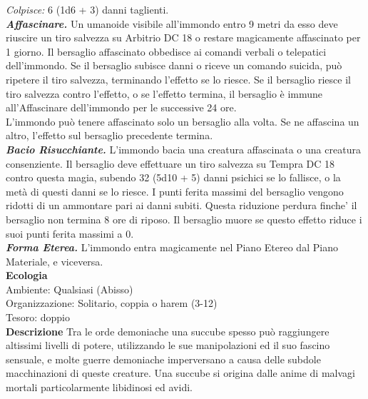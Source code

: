 \begin{multicols}{2}
\emph{Colpisce:} 6 (1d6 + 3) danni taglienti.\\
\emph{\textbf{Affascinare.}} Un umanoide visibile all'immondo entro 9 metri da esso deve riuscire un tiro salvezza su Arbitrio DC  18 o restare magicamente affascinato per 1 giorno. Il bersaglio affascinato obbedisce ai comandi verbali o telepatici dell'immondo. Se il bersaglio subisce danni o riceve un comando suicida, può ripetere il tiro salvezza, terminando l'effetto se lo riesce. Se il bersaglio riesce il tiro salvezza contro l'effetto, o se l'effetto termina, il bersaglio è immune all'Affascinare dell'immondo per le successive 24 ore.\\
L'immondo può tenere affascinato solo un bersaglio alla volta. Se ne affascina un altro, l'effetto sul bersaglio precedente termina.\\
\emph{\textbf{Bacio Risucchiante.}} L'immondo bacia una creatura affascinata o una creatura consenziente. Il bersaglio deve effettuare un tiro salvezza su Tempra DC  18 contro questa magia, subendo 32 (5d10 + 5) danni psichici se lo fallisce, o la metà di questi danni se lo riesce. I punti ferita massimi del bersaglio vengono ridotti di un ammontare pari ai danni subiti. Questa riduzione perdura finche' il bersaglio non termina 8 ore di riposo. Il bersaglio muore se questo effetto riduce i suoi punti ferita massimi a 0.\\
\emph{\textbf{Forma Eterea.}} L'immondo entra magicamente nel Piano Etereo dal Piano Materiale, e viceversa.\\
\textbf{Ecologia}\\
Ambiente: Qualsiasi (Abisso)\\
Organizzazione: Solitario, coppia o harem (3-12)\\
Tesoro: doppio\\
\textbf{Descrizione}
Tra le orde demoniache una succube spesso può raggiungere altissimi livelli di potere, utilizzando le sue manipolazioni ed il suo fascino sensuale, e molte guerre demoniache imperversano a causa delle subdole macchinazioni di queste creature. Una succube si origina dalle anime di malvagi mortali particolarmente libidinosi ed avidi.\\



\end{multicols}
